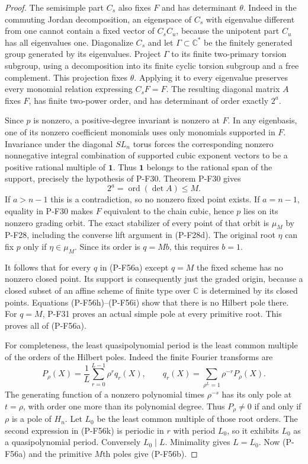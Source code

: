 \begin{proof}
The semisimple part $C_s$ also fixes $F$ and has determinant
$\theta$. Indeed in the commuting Jordan decomposition,
an eigenspace of $C_s$ with eigenvalue different from one
cannot contain a fixed vector of $C_sC_u$, because the
unipotent part $C_u$ has all eigenvalues one.
Diagonalize $C_s$ and let $\Gamma\subset\mathbb C^*$ be
the finitely generated group generated by its eigenvalues.
Project $\Gamma$ to its finite two-primary torsion subgroup,
using a decomposition into its finite cyclic torsion subgroup
and a free complement. This projection fixes $\theta$.
Applying it to every eigenvalue preserves every monomial
relation expressing $C_sF=F$.
The resulting diagonal matrix $A$ fixes $F$, has finite
two-power order, and has determinant of order exactly $2^a$.

Since $p$ is nonzero, a positive-degree invariant is nonzero
at $F$. In any eigenbasis, one of its nonzero coefficient
monomials uses only monomials supported in $F$.
Invariance under the diagonal $SL_n$ torus forces the
corresponding nonzero nonnegative integral combination of supported
cubic exponent vectors to be a positive rational multiple
of $\mathbf1$. Thus $\mathbf1$ belongs to the rational
span of the support, precisely the hypothesis of P-F30.
Theorem P-F30 gives
\[
                       2^a=\operatorname{ord}(\det A)\le M.
 \tag{P-F56j}
\]
If $a>n-1$ this is a contradiction, so no nonzero fixed
point exists. If $a=n-1$, equality in P-F30 makes $F$
equivalent to the chain cubic, hence $p$ lies on its
nonzero grading orbit. The exact stabilizer of every
point of that orbit is $\mu_M$ by P-F28, including the
converse lift argument in (P-F28d).
The original root $\eta$ can fix $p$ only if $\eta\in\mu_M$.
Since its order is $q=Mb$, this requires $b=1$.

It follows that for every $q$ in (P-F56a) except $q=M$
the fixed scheme has no nonzero closed point. Its support
is consequently just the graded origin, because a closed
subset of an affine scheme of finite type over $\mathbb C$
is determined by its closed points. Equations
(P-F56h)--(P-F56i) show that there is no Hilbert pole there.
For $q=M$, P-F31 proves an actual simple pole at every
primitive root. This proves all of (P-F56a).

For completeness, the least quasipolynomial period is the
least common multiple of the orders of the Hilbert poles.
Indeed the finite Fourier transforms are
\[
 P_\rho(X)=\frac1L\sum_{r=0}^{L-1}\rho^r q_r(X),\qquad
 q_r(X)=\sum_{\rho^L=1}\rho^{-r}P_\rho(X).                 \tag{P-F56k}
\]
The generating function of a nonzero polynomial times
$\rho^{-s}$ has its only pole at $t=\rho$, with order
one more than its polynomial degree. Thus $P_\rho\ne0$
if and only if $\rho$ is a pole of $H_n$.
Let $L_0$ be the least common multiple of those root orders.
The second expression in (P-F56k) is periodic in $r$
with period $L_0$, so it exhibits $L_0$ as a quasipolynomial
period. Conversely $L_0\mid L$. Minimality gives $L=L_0$.
Now (P-F56a) and the primitive $M$th poles give (P-F56b).


\end{proof}
